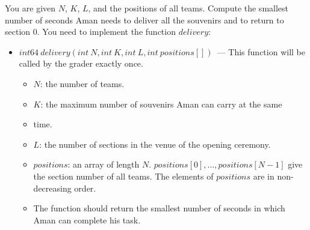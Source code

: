 You are given $N$, $K$, $L$, and the positions of all teams. Compute the smallest number of seconds Aman needs to deliver all the souvenirs and to return to section $0$. You need to implement the function $delivery$:
\begin{itemize}
\item $int64\ delivery(int\ N, int\ K, int\ L, int\ positions[])$~--- This function will be called by the grader exactly once.
\begin{itemize}
\item $N$: the number of teams.
\item $K$: the maximum number of souvenirs Aman can carry at the same
\item time.
\item $L$: the number of sections in the venue of the opening ceremony.
\item $positions$: an array of length $N$. $positions[0], \ldots, positions[N - 1]$ give the section number of all teams. The elements of $positions$ are in non-decreasing order.
\item The function should return the smallest number of seconds in which Aman can complete his task.
\end{itemize}
\end{itemize}